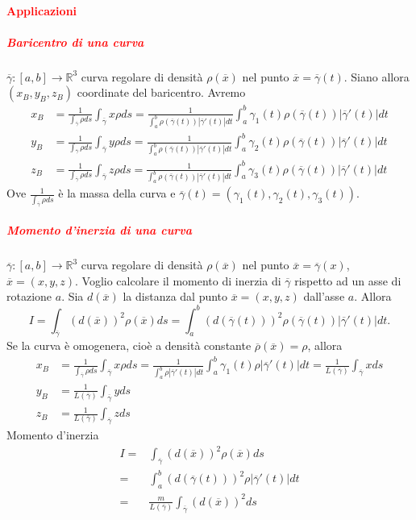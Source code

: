 \documentclass{article}
\newcommand{\R}{\mathbb{R}}
\begin{document}
\paragraph{\textcolor{red}{Applicazioni}}
\subparagraph{\textcolor{red}{\textbf{Baricentro  di una curva}}}
$\overline{\gamma}:[a,b]\rightarrow \R^3$ curva regolare di densità $\rho(\overline{x})$ nel punto $\overline{x}=\overline{\gamma}(t)$. Siano allora $(x_B,y_B,z_B)$ coordinate del baricentro. Avremo
\begin{align*}
    x_B&=\frac{1}{\int_{\overline{\gamma}}\rho ds}\int_{\overline{\gamma}}x\rho ds=\frac{1}{\int_a^b \rho(\overline{\gamma}(t))|\overline{\gamma}'(t)|dt}\int_a^b \gamma_1(t)\rho(\overline{\gamma}(t))|\overline{\gamma}'(t)|dt\\
y_B&=\frac{1}{\int_{\overline{\gamma}}\rho ds}\int_{\overline{\gamma}}y \rho ds= \frac{1}{\int_a^b \rho(\overline{\gamma}(t))|\overline{\gamma}'(t)|dt}\int_a^b \gamma_2(t)\rho(\overline{\gamma}(t))|\overline{\gamma}'(t)|dt\\
z_B&=\frac{1}{\int_{\overline{\gamma}}\rho ds}\int_{\overline{\gamma}}z \rho ds= \frac{1}{\int_a^b \rho(\overline{\gamma}(t))|\overline{\gamma}'(t)|dt}\int_a^b \gamma_3(t)\rho(\overline{\gamma}(t))|\overline{\gamma}'(t)|dt
\end{align*}
Ove $\frac{1}{\int_{\overline{\gamma}}\rho ds}$ è la massa della curva e $\overline{\gamma}(t)=(\gamma_1(t),\gamma_2(t),\gamma_3(t))$.

\subparagraph{\textcolor{red}{\textbf{Momento d'inerzia di una curva}}}
$\overline{\gamma}:[a,b]\rightarrow \R^3$ curva regolare di densità $\rho(\overline{x}) $ nel punto $\overline{x}=\overline{\gamma}(x)$, $\overline{x}=(x,y,z)$. Voglio calcolare il momento di inerzia di $\overline{\gamma}$ rispetto ad un asse di rotazione $a$. Sia $d(\overline{x})$ la distanza dal punto $\overline{x}=(x,y,z)$ dall'asse $a$. Allora
\begin{equation*}
    I= \int_{\overline{\gamma}}(d(\overline{x}))^2 \rho(\overline{x})ds= \int_a^b (d(\overline{\gamma}(t)))^2 \rho (\overline{\gamma}(t))|\overline{\gamma}'(t)|dt.
\end{equation*}
Se la curva è omogenera, cioè a densità constante $\overline{\rho}(\overline{x})=\rho$, allora 
\begin{align*}
    x_B&= \frac{1}{\int_{\overline{\gamma}}\rho ds}\int_{\overline{\gamma}}x \rho ds = \frac{1}{\int_a^b\rho|\overline{\gamma}'(t)|dt}\int_a^b \gamma_1 (t) \rho |\overline{\gamma}'(t)|dt= \frac{1}{L(\overline{\gamma})}\int_{\overline{\gamma}}x ds\\
    y_B&=\frac{1}{L(\overline{\gamma})}\int_{\overline{\gamma}}y ds\\
    z_B&= \frac{1}{L(\overline{\gamma})}\int_{\overline{\gamma}}z ds
\end{align*}
Momento d'inerzia
\begin{align*}
    I=& \int_{\overline{\gamma}}(d(\overline{x}))^2\rho(\overline{x})ds\\
    =& \int_a^b (d(\overline{\gamma}(t)))^2 \rho|\overline{\gamma}'(t)|dt\\
    =& \frac{m}{L(\overline{\gamma})}\int_{\overline{\gamma}}(d(\overline{x}))^2 ds
\end{align*}
\end{document}
